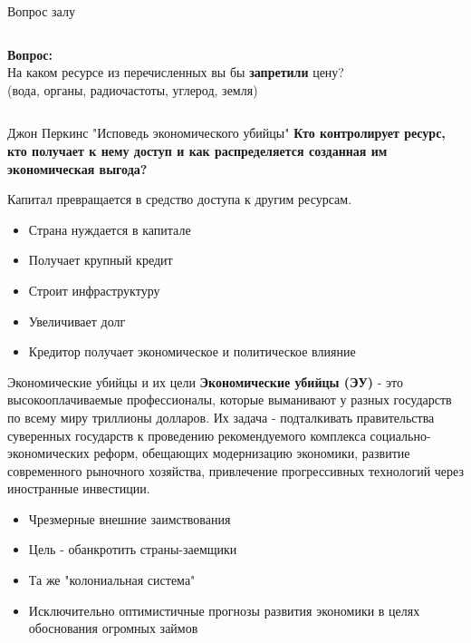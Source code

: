 \documentclass[10pt]{beamer}
\begin{document}
\begin{frame}{Вопрос залу}
  \begin{columns}
    \textbf{Вопрос:} \\
    На каком ресурсе из перечисленных вы бы \textbf{запретили} цену? \\
    (вода, органы, радиочастоты, углерод, земля)
  \end{columns}
\end{frame}

\begin{frame}{Джон Перкинс "Исповедь экономического убийцы"}
 \textbf{Кто контролирует ресурс, кто получает к нему доступ и как распределяется созданная им экономическая выгода?}
 \vspace{0.5cm}

Капитал превращается в средство доступа к другим ресурсам.

\begin{itemize}
    \item Страна нуждается в капитале
    \item Получает крупный кредит
    \item Строит инфраструктуру
    \item Увеличивает долг
    \item Кредитор получает экономическое и политическое влияние
\end{itemize}
 
\end{frame}

\begin{frame}{Экономические убийцы и их цели}
\textbf{Экономические убийцы (ЭУ)} - это высокооплачиваемые профессионалы, которые выманивают у разных государств по всему миру триллионы долларов. Их задача - подталкивать правительства суверенных государств к проведению рекомендуемого комплекса социально-экономических реформ, обещающих модернизацию экономики, развитие современного рыночного хозяйства, привлечение прогрессивных технологий через иностранные инвестиции.
\vspace{0.5cm}
\begin{itemize}
    \item Чрезмерные внешние заимствования
    \item Цель - обанкротить страны-заемщики
    \item Та же "колониальная система"
    \item Исключительно оптимистичные прогнозы развития экономики в целях обоснования огромных займов
\end{itemize}
\end{frame}
\end{document}
